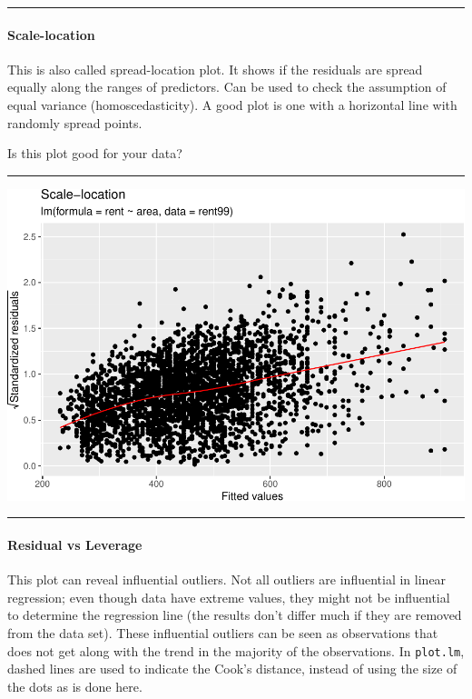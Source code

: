 \documentclass[
]{article}
\begin{document}
\begin{center}\rule{0.5\linewidth}{0.5pt}\end{center}

\hypertarget{scale-location}{%
\paragraph{Scale-location}\label{scale-location}}

This is also called spread-location plot. It shows if the residuals are
spread equally along the ranges of predictors. Can be used to check the
assumption of equal variance (homoscedasticity). A good plot is one with
a horizontal line with randomly spread points.

Is this plot good for your data?

\begin{center}\rule{0.5\linewidth}{0.5pt}\end{center}

\includegraphics{2MLR_files/figure-latex/unnamed-chunk-12-1.pdf}

\begin{center}\rule{0.5\linewidth}{0.5pt}\end{center}

\hypertarget{residual-vs-leverage}{%
\paragraph{Residual vs Leverage}\label{residual-vs-leverage}}

This plot can reveal influential outliers. Not all outliers are
influential in linear regression; even though data have extreme values,
they might not be influential to determine the regression line (the
results don't differ much if they are removed from the data set). These
influential outliers can be seen as observations that does not get along
with the trend in the majority of the observations. In \texttt{plot.lm},
dashed lines are used to indicate the Cook's distance, instead of using
the size of the dots as is done here.
\end{document}
